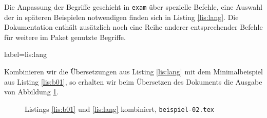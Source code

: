 Die Anpassung der Begriffe geschieht in \texttt{exam} über spezielle Befehle, eine Auswahl der in späteren Beispielen notwendigen finden sich in Listing \ref{lis:lang}. Die Dokumentation enthält zusätzlich noch eine Reihe anderer entsprechender Befehle für weitere im Paket genutzte Begriffe.

\begin{lfgwcode}{label={lis:lang}}
\renewcommand{\solutiontitle}{\noindent\textbf{Lösung:}\enspace}
 

\end{lfgwcode}

Kombinieren wir die Übersetzungen aus Listing \ref{lis:lang} mit dem Minimalbeispiel aus Listing \ref{lis:b01}, so erhalten wir beim Übersetzen des Dokuments die Ausgabe von Abbildung \ref{fig:b02}.

\begin{figure}[b]
\caption{Listings \ref{lis:b01} und \ref{lis:lang} kombiniert, \texttt{beispiel-02.tex}}\label{fig:b02}
\end{figure}

